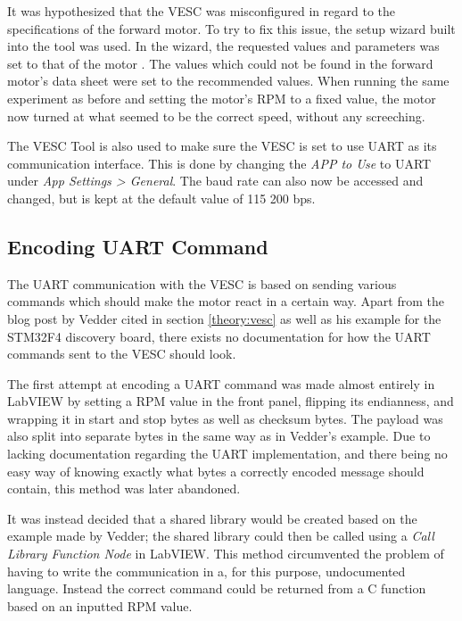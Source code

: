 It was hypothesized that the VESC was misconfigured in regard to the specifications of the forward motor. To try to fix this issue, the setup wizard built into the tool was used. In the wizard, the requested values and parameters was set to that of the motor \cite{Shimano2022DU-E6010}. The values which could not be found in the forward motor's data sheet were set to the recommended values. When running the same experiment as before and setting the motor's RPM to a fixed value, the motor now turned at what seemed to be the correct speed, without any screeching.

The VESC Tool is also used to make sure the VESC is set to use UART as its communication interface. This is done by changing the \textit{APP to Use} to UART under \textit{App Settings > General}. The baud rate can also now be accessed and changed, but is kept at the default value of 115 200 bps.

\subsection{Encoding UART Command}

The UART communication with the VESC is based on sending various commands which should make the motor react in a certain way. Apart from the blog post by Vedder cited in section \ref{theory:vesc} as well as his example for the STM32F4 discovery board, there exists no documentation for how the UART commands sent to the VESC should look. 

The first attempt at encoding a UART command was made almost entirely in LabVIEW by setting a RPM value in the front panel, flipping its endianness, and wrapping it in start and stop bytes as well as checksum bytes. The payload was also split into separate bytes in the same way as in Vedder's example. Due to lacking documentation regarding the UART implementation, and there being no easy way of knowing exactly what bytes a correctly encoded message should contain, this method was later abandoned.

It was instead decided that a shared library would be created based on the example made by Vedder; the shared library could then be called using a \textit{Call Library Function Node} in LabVIEW. This method circumvented the problem of having to write the communication in a, for this purpose, undocumented language. Instead the correct command could be returned from a C function based on an inputted RPM value. 

